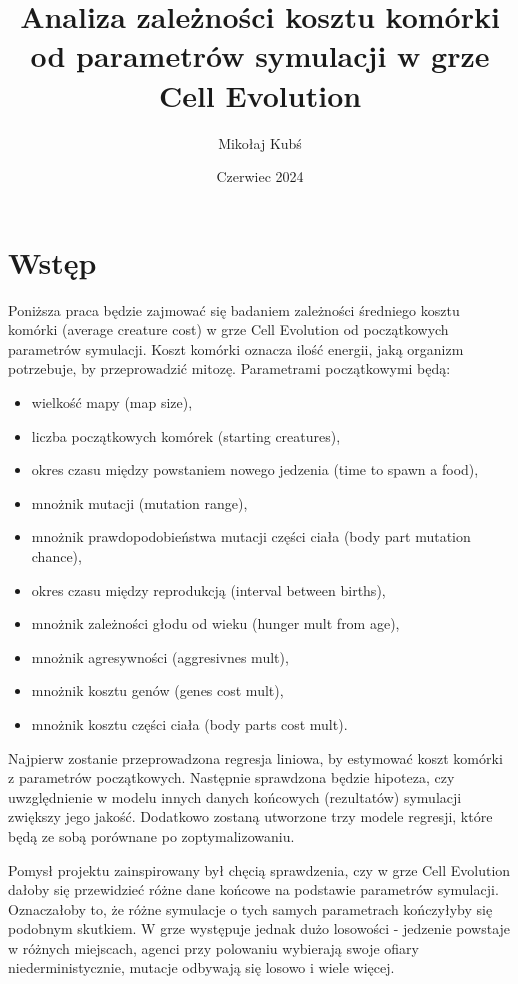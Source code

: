 \documentclass{article}
\title{Analiza zależności kosztu komórki od parametrów symulacji w grze Cell Evolution}
\author{Mikołaj Kubś}
\date{Czerwiec 2024}
\begin{document}
\maketitle
\tableofcontents

\newpage

\section{Wstęp}
Poniższa praca będzie zajmować się badaniem zależności średniego kosztu komórki (average creature cost) w grze Cell Evolution od początkowych parametrów symulacji. Koszt komórki oznacza ilość energii, jaką organizm potrzebuje, by przeprowadzić mitozę. Parametrami początkowymi będą:
\begin{itemize}[itemsep=0mm]
    \item wielkość mapy (map size),
    \item liczba początkowych komórek (starting creatures),
    \item okres czasu między powstaniem nowego jedzenia (time to spawn a food),
    \item mnożnik mutacji (mutation range),
    \item mnożnik prawdopodobieństwa mutacji części ciała (body part mutation chance),
    \item okres czasu między reprodukcją (interval between births),
    \item mnożnik zależności głodu od wieku (hunger mult from age),
    \item mnożnik agresywności (aggresivnes mult),
    \item mnożnik kosztu genów (genes cost mult),
    \item mnożnik kosztu części ciała (body parts cost mult).
\end{itemize}
Najpierw zostanie przeprowadzona regresja liniowa, by estymować koszt komórki z parametrów początkowych. Następnie sprawdzona będzie hipoteza, czy uwzględnienie w modelu innych danych końcowych (rezultatów) symulacji zwiększy jego jakość.
Dodatkowo zostaną utworzone trzy modele regresji, które będą ze sobą porównane po zoptymalizowaniu. 

Pomysł projektu zainspirowany był chęcią sprawdzenia, czy w grze Cell Evolution dałoby się przewidzieć różne dane końcowe na podstawie parametrów symulacji. Oznaczałoby to, że różne symulacje o tych samych parametrach kończyłyby się podobnym skutkiem. W grze występuje jednak dużo losowości - jedzenie powstaje w różnych miejscach, agenci przy polowaniu wybierają swoje ofiary niederministycznie, mutacje odbywają się losowo i wiele więcej. 
\end{document}
